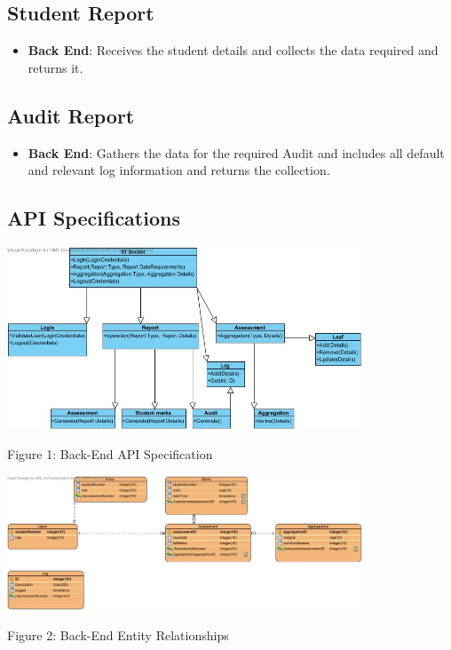 \documentclass[a4paper]{article}
\begin{document}
\subsection*{Student Report}
\begin{itemize}
\item \textbf{Back End}: Receives the student details and collects the data required and returns it.
\end{itemize}

\subsection*{Audit Report}
\begin{itemize}
\item \textbf{Back End}:  Gathers the data for the required Audit and includes all default and relevant log information and returns the collection.
\end{itemize}

\subsection*{API Specifications}

\includegraphics[width=400px]{Images/APIBackEnd1.jpg}
\begin{center}
Figure 1: Back-End API Specification
\end{center}

\includegraphics[width=400px]{Images/APIBackEnd2.jpg}
\begin{center}
Figure 2: Back-End Entity Relationships
\end{center}
\end{document}

